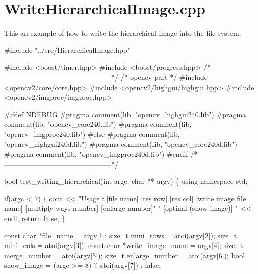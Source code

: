 \section{Write\-Hierarchical\-Image.\-cpp}
This an example of how to write the hierarchical image into the file system.


\begin{DoxyCodeInclude}
\textcolor{preprocessor}{#include "../src/HierarchicalImage.hpp"}

\textcolor{preprocessor}{#include <boost/timer.hpp>}
\textcolor{preprocessor}{#include <boost/progress.hpp>}
\textcolor{comment}{/*---------------------------------------------*/}
\textcolor{comment}{/* opencv part */}
\textcolor{preprocessor}{#include <opencv2/core/core.hpp>}
\textcolor{preprocessor}{#include <opencv2/highgui/highgui.hpp>}
\textcolor{preprocessor}{#include <opencv2/imgproc/imgproc.hpp>}

\textcolor{preprocessor}{#ifdef NDEBUG}
\textcolor{preprocessor}{}\textcolor{preprocessor}{#pragma comment(lib, "opencv\_highgui240.lib")}
\textcolor{preprocessor}{}\textcolor{preprocessor}{#pragma comment(lib, "opencv\_core240.lib")}
\textcolor{preprocessor}{}\textcolor{preprocessor}{#pragma comment(lib, "opencv\_imgproc240.lib")}
\textcolor{preprocessor}{}\textcolor{preprocessor}{#else}
\textcolor{preprocessor}{}\textcolor{preprocessor}{#pragma comment(lib, "opencv\_highgui240d.lib")}
\textcolor{preprocessor}{}\textcolor{preprocessor}{#pragma comment(lib, "opencv\_core240d.lib")}
\textcolor{preprocessor}{}\textcolor{preprocessor}{#pragma comment(lib, "opencv\_imgproc240d.lib")}
\textcolor{preprocessor}{}\textcolor{preprocessor}{#endif}
\textcolor{preprocessor}{}\textcolor{comment}{/*---------------------------------------------*/}

\textcolor{keywordtype}{bool} test\_writing\_hierarchical(\textcolor{keywordtype}{int} argc, \textcolor{keywordtype}{char} ** argv)
\{
        \textcolor{keyword}{using namespace }std;

        \textcolor{keywordflow}{if}(argc < 7) \{
                cout << \textcolor{stringliteral}{"Usage : [file name] [res row] [res col] [write image
       file name] [multiply ways number] [enlarge number]"}
                        \textcolor{stringliteral}{" [optinal (show image)] "} << endl;
                \textcolor{keywordflow}{return} \textcolor{keyword}{false};
        \}

        \textcolor{keyword}{const} \textcolor{keywordtype}{char} *file\_name = argv[1];
        \textcolor{keywordtype}{size\_t} mini\_rows = atoi(argv[2]);
        \textcolor{keywordtype}{size\_t} mini\_cols = atoi(argv[3]);
        \textcolor{keyword}{const} \textcolor{keywordtype}{char} *write\_image\_name = argv[4];
        \textcolor{keywordtype}{size\_t} merge\_number = atoi(argv[5]);
        \textcolor{keywordtype}{size\_t} enlarge\_number = atoi(argv[6]);
        \textcolor{keywordtype}{bool} show\_image = (argc >= 8) ? atoi(argv[7]) : \textcolor{keyword}{false};


\end{DoxyCodeInclude}
